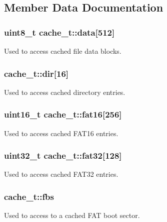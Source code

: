\subsection{Member Data Documentation}
\subsubsection[{\texorpdfstring{data}{data}}]{\setlength{\rightskip}{0pt plus 5cm}uint8\+\_\+t cache\+\_\+t\+::data\mbox{[}512\mbox{]}}\hypertarget{unioncache__t_ae675b7a3a87d809070de111d1d1f1d81}{}\label{unioncache__t_ae675b7a3a87d809070de111d1d1f1d81}
Used to access cached file data blocks. 
\subsubsection[{\texorpdfstring{dir}{dir}}]{ cache\+\_\+t\+::dir\mbox{[}16\mbox{]}}\hypertarget{unioncache__t_a7396fdbdb7c52bd1d72c5329ff32acd1}{}\label{unioncache__t_a7396fdbdb7c52bd1d72c5329ff32acd1}
Used to access cached directory entries. 
\subsubsection[{\texorpdfstring{fat16}{fat16}}]{\setlength{\rightskip}{0pt plus 5cm}uint16\+\_\+t cache\+\_\+t\+::fat16\mbox{[}256\mbox{]}}\hypertarget{unioncache__t_a8f3a4e9392a7d8ace954fc44c57df887}{}\label{unioncache__t_a8f3a4e9392a7d8ace954fc44c57df887}
Used to access cached F\+A\+T16 entries. 
\subsubsection[{\texorpdfstring{fat32}{fat32}}]{\setlength{\rightskip}{0pt plus 5cm}uint32\+\_\+t cache\+\_\+t\+::fat32\mbox{[}128\mbox{]}}\hypertarget{unioncache__t_a57e16421bf460d1ba6cb9ce9a23a4a83}{}\label{unioncache__t_a57e16421bf460d1ba6cb9ce9a23a4a83}
Used to access cached F\+A\+T32 entries. 
\subsubsection[{\texorpdfstring{fbs}{fbs}}]{ cache\+\_\+t\+::fbs}\hypertarget{unioncache__t_ad1a4f1c0e8b8ca4d530427dbc920c764}{}\label{unioncache__t_ad1a4f1c0e8b8ca4d530427dbc920c764}
Used to access to a cached F\+AT boot sector. 
